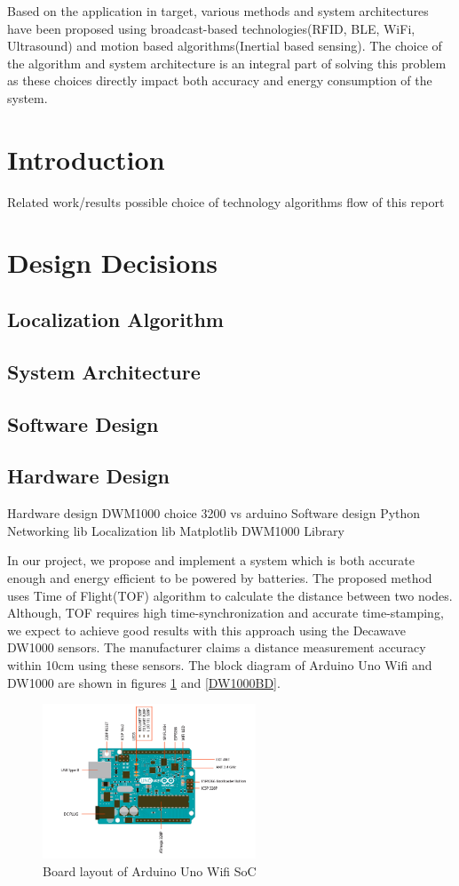 \documentclass[journal,transmag]{IEEEtran}
\begin{document}
Based on the application in target, various methods and system architectures have been proposed using broadcast-based technologies(RFID\cite{bouet2008rfid}, BLE\cite{alps}, WiFi\cite{yang2012locating}, Ultrasound\cite{ultrasonic}) and motion based algorithms(Inertial based sensing)\cite{li2012reliable}. The choice of the algorithm and system architecture is an integral part of solving this problem as these choices directly impact both accuracy and energy consumption of the system. 
\section{Introduction}
Related work/results
possible choice of technology
algorithms
flow of this report

\section{Design Decisions}
\subsection{Localization Algorithm}
\subsection{System Architecture}
\subsection{Software Design}
\subsection{Hardware Design}
Hardware design
    DWM1000 choice
    3200 vs arduino
Software design
    Python
        Networking lib
        Localization lib
        Matplotlib
    DWM1000
        Library

In our project, we propose and implement a system which is both accurate enough and energy efficient to be powered by batteries. The proposed method uses Time of Flight(TOF) algorithm to calculate the distance between two nodes. Although, TOF requires high time-synchronization and accurate time-stamping, we expect to achieve good results with this approach using the Decawave DW1000 sensors. The manufacturer claims a distance measurement accuracy within 10cm using these sensors.  The block diagram of Arduino Uno Wifi and DW1000 are shown in figures \ref{arduinoBD} and \ref{DW1000BD}.

\begin{figure}[!h]
\centering
\includegraphics[width=2.5in]{arduinounobd}
\caption{{Board layout of Arduino Uno Wifi SoC}}
\label{arduinoBD}
\end{figure}
\end{document}
